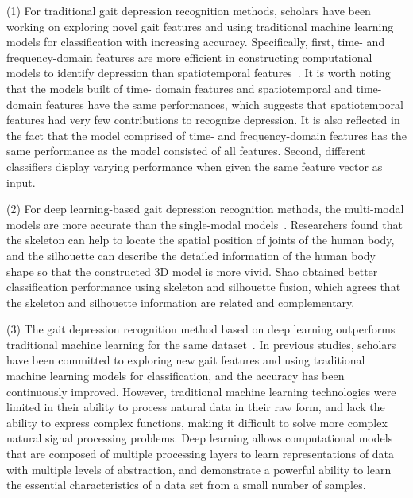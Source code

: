 (1) For traditional gait depression recognition methods, scholars have been working on exploring novel gait features and using traditional machine learning models for classification with increasing accuracy.
Specifically, first, time- and frequency-domain features are more efficient in constructing computational models to identify depression than spatiotemporal features~\cite{wang2021detecting}. It is worth noting that the models built of time- domain features and spatiotemporal and time- domain features have the same performances, which suggests that spatiotemporal features had very few contributions to recognize depression. It is also reflected in the fact that the model comprised of time- and frequency-domain features has the same performance as the model consisted of all features. Second, different classifiers display varying performance when given the same feature vector as input.


(2) For deep learning-based gait depression recognition methods, the multi-modal models are more accurate than the single-modal models~\cite{shao2021multi}. Researchers found that the skeleton can help to locate the spatial position of joints of the human body, and the silhouette can describe the detailed information of the human body shape so that the constructed 3D model is more vivid.
Shao obtained better classification performance using skeleton and silhouette fusion, which agrees that the skeleton and silhouette information are related and complementary.


(3)
The gait depression recognition method based on deep learning outperforms traditional machine learning for the same dataset~\cite{9187648,fang2019depression,yang2022data}.
In previous studies, scholars have been committed to exploring new gait features and using traditional machine learning models for classification, and the accuracy has been continuously improved.
However, traditional machine learning technologies were limited in their ability to process natural data in their raw form, and lack the ability to express complex functions, making it difficult to solve more complex natural signal processing problems. Deep learning allows computational models that are composed of multiple processing layers to learn representations of data with multiple levels of abstraction, and demonstrate a powerful ability to learn the essential characteristics of a data set from a small number of samples.


